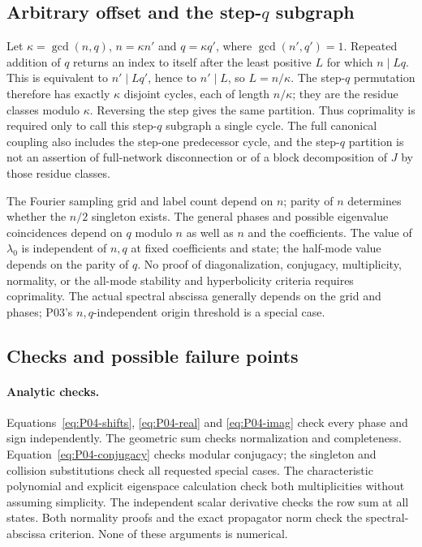 \subsection{Arbitrary offset and the step-\texorpdfstring{$q$}{q} subgraph}
\label{prop:P04-step-cycles}
Let $\kappa=\gcd(n,q)$, $n=\kappa n'$ and $q=\kappa q'$,
where $\gcd(n',q')=1$. Repeated addition of $q$ returns an index
to itself after the least positive $L$ for which $n\mid Lq$.
This is equivalent to $n'\mid Lq'$, hence to $n'\mid L$,
so $L=n/\kappa$. The step-$q$ permutation therefore has exactly
$\kappa$ disjoint cycles, each of length $n/\kappa$; they are the
residue classes modulo $\kappa$. Reversing the step gives the same
partition. Thus coprimality is required only to call this step-$q$
subgraph a single cycle. The full canonical coupling also includes
the step-one predecessor cycle, and the step-$q$ partition is not
an assertion of full-network disconnection or of a block decomposition
of $J$ by those residue classes.

The Fourier sampling grid and label count depend on $n$; parity of
$n$ determines whether the $n/2$ singleton exists. The general phases
and possible eigenvalue coincidences depend on $q$ modulo $n$ as
well as $n$ and the coefficients. The value of $\lambda_0$ is
independent of $n,q$ at fixed coefficients and state; the half-mode
value depends on the parity of $q$. No proof of diagonalization,
conjugacy, multiplicity, normality, or the all-mode stability and
hyperbolicity criteria requires coprimality. The actual spectral
abscissa generally depends on the grid and phases; P03's
$n,q$-independent origin threshold is a special case.

\subsection{Checks and possible failure points}
\label{subsec:P04-checks}

\paragraph{Analytic checks.}
Equations~\eqref{eq:P04-shifts}, \eqref{eq:P04-real} and
\eqref{eq:P04-imag} check every phase and sign independently.
The geometric sum checks normalization and completeness.
Equation~\eqref{eq:P04-conjugacy} checks modular conjugacy; the
singleton and collision substitutions check all requested special
cases. The characteristic polynomial and explicit eigenspace
calculation check both multiplicities without assuming simplicity.
The independent scalar derivative checks the row sum at all states.
Both normality proofs and the exact propagator norm check the
spectral-abscissa criterion. None of these arguments is numerical.

